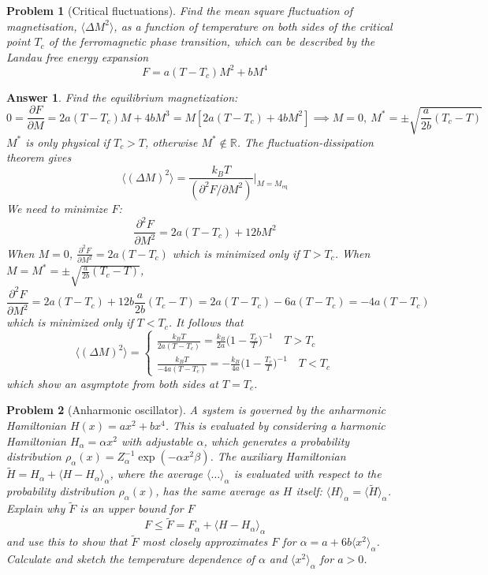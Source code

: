 \documentclass[a4paper]{article}
\theoremstyle{new2}
\newtheorem{ans}{Answer}[section]
\theoremstyle{new}
\newtheorem{qns}{Problem}[section]
\begin{document}
\newpage
\begin{qns}[Critical fluctuations]
Find the mean square fluctuation of magnetisation, $\langle\Delta M^2\rangle$, as a function of temperature on both sides of the critical point $T_c$ of the ferromagnetic phase transition, which can be described by the Landau free energy expansion 
$$F=a(T-T_c)M^2+bM^4$$
\end{qns}
\begin{ans}
Find the equilibrium magnetization:
$$0=\frac{\partial F}{\partial M}=2a(T-T_c)M+4bM^3=M[2a(T-T_c)+4bM^2]\implies M=0,~M^*=\pm\sqrt{\frac{a}{2b}(T_c-T)}$$
$M^*$ is only physical if $T_c>T$, otherwise $M^*\notin\mathbb{R}$. The fluctuation-dissipation theorem gives
$$\langle(\Delta M)^2\rangle=\frac{k_BT}{(\partial^2F/\partial M^2)}\bigg|_{M=M_{\text{eq}}}$$
We need to minimize $F$:
$$\frac{\partial^2F}{\partial M^2}=2a(T-T_c)+12bM^2$$
When $M=0$, $\frac{\partial^2F}{\partial M^2}=2a(T-T_c)$ which is minimized only if $T>T_c$. When $M=M^*=\pm\sqrt{\frac{a}{2b}(T_c-T)}$,
$$\frac{\partial^2F}{\partial M^2}=2a(T-T_c)+12b\frac{a}{2b}(T_c-T)=2a(T-T_c)-6a(T-T_c)=-4a(T-T_c)$$
which is minimized only if $T<T_c$. It follows that
\begin{equation*}
  \langle(\Delta M)^2\rangle = \begin{cases}
        \frac{k_BT}{2a(T-T_c)}=\frac{k_B}{2a}\bigg(1-\frac{T_c}{T}\bigg)^{-1}\quad T>T_c        \\
        \frac{k_BT}{-4a(T-T_c)}=-\frac{k_B}{4a}\bigg(1-\frac{T_c}{T}\bigg)^{-1}\quad T<T_c        \end{cases}
 \end{equation*}
 which show an asymptote from both sides at $T=T_c$.
\end{ans}
\newpage
\begin{qns}[Anharmonic oscillator]
A system is governed by the anharmonic Hamiltonian $H(x) = ax^2 +bx^4$. This is evaluated by considering a harmonic Hamiltonian $H_\alpha=\alpha x^2$ with adjustable $\alpha$, which generates a probability distribution $\rho_\alpha(x)=Z_\alpha^{-1}\exp(-\alpha x^2\beta)$. The auxiliary Hamiltonian $\tilde{H}=H_\alpha+\langle H-H_\alpha\rangle_\alpha$, where the average $\langle\dots\rangle_\alpha$ is evaluated with respect to the probability distribution $\rho_\alpha(x)$, has the same average as $H$ itself: $\langle H\rangle_\alpha=\langle\tilde{H}\rangle_\alpha$.\\[5pt]
Explain why $\tilde{F}$ is an upper bound for $F$
$$F\leq\tilde{F}=F_\alpha+\langle H-H_\alpha\rangle_\alpha$$
and use this to show that $\tilde{F}$ most closely approximates $F$ for $\alpha=a+6b\langle x^2\rangle_\alpha$. Calculate and sketch the temperature dependence of $\alpha$ and $\langle x^2\rangle_\alpha$ for $a > 0$.
\end{qns}
\end{document}
